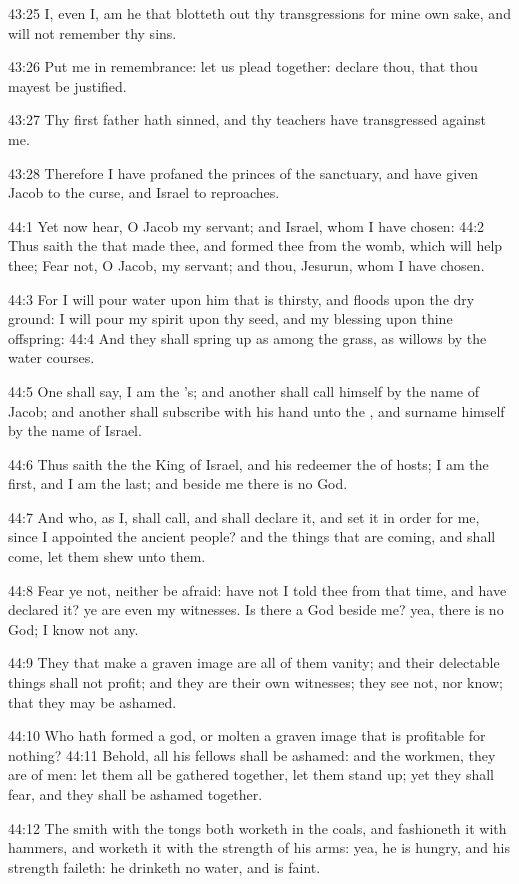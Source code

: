 43:25 I, even I, am he that blotteth out thy transgressions for mine own sake, and will not remember thy sins.

43:26 Put me in remembrance: let us plead together: declare thou, that thou mayest be justified.

43:27 Thy first father hath sinned, and thy teachers have transgressed against me.

43:28 Therefore I have profaned the princes of the sanctuary, and have given Jacob to the curse, and Israel to reproaches.

44:1 Yet now hear, O Jacob my servant; and Israel, whom I have chosen: 44:2 Thus saith the \LORD that made thee, and formed thee from the womb, which will help thee; Fear not, O Jacob, my servant; and thou, Jesurun, whom I have chosen.

44:3 For I will pour water upon him that is thirsty, and floods upon the dry ground: I will pour my spirit upon thy seed, and my blessing upon thine offspring: 44:4 And they shall spring up as among the grass, as willows by the water courses.

44:5 One shall say, I am the \LORD's; and another shall call himself by the name of Jacob; and another shall subscribe with his hand unto the \LORD, and surname himself by the name of Israel.

44:6 Thus saith the \LORD the King of Israel, and his redeemer the \LORD of hosts; I am the first, and I am the last; and beside me there is no God.

44:7 And who, as I, shall call, and shall declare it, and set it in order for me, since I appointed the ancient people? and the things that are coming, and shall come, let them shew unto them.

44:8 Fear ye not, neither be afraid: have not I told thee from that time, and have declared it? ye are even my witnesses. Is there a God beside me? yea, there is no God; I know not any.

44:9 They that make a graven image are all of them vanity; and their delectable things shall not profit; and they are their own witnesses; they see not, nor know; that they may be ashamed.

44:10 Who hath formed a god, or molten a graven image that is profitable for nothing?  44:11 Behold, all his fellows shall be ashamed: and the workmen, they are of men: let them all be gathered together, let them stand up; yet they shall fear, and they shall be ashamed together.

44:12 The smith with the tongs both worketh in the coals, and fashioneth it with hammers, and worketh it with the strength of his arms: yea, he is hungry, and his strength faileth: he drinketh no water, and is faint.

